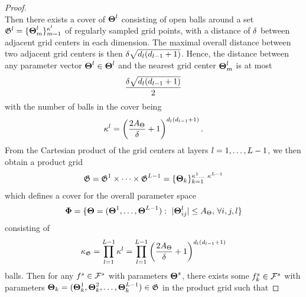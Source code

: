 \documentclass[review,supplement,onefignum,onetabnum]{siamonline250211}
\begin{document}
\begin{proof}
\begin{equation}
\end{equation}
%
Then there exists a cover of $\mathbf{\boldsymbol{\Theta}}^l$ consisting of open balls around a set $\mathfrak{G}^{l} = \{ \boldsymbol{\Theta}^{l}_m \}_{m=1}^{\kappa^l}$ of regularly sampled grid points, with a distance of $\delta $ between adjacent grid centers in each dimension. The maximal overall distance between two adjacent grid centers is then $\delta  \sqrt{{d_l}({d_{l-1}}+1)}$. Hence, the distance between any parameter vector $\boldsymbol{\Theta}^{l} \in \mathbf{\boldsymbol{\Theta}}^l $ and the nearest grid center $\boldsymbol{\Theta}^{l}_m $ is at most
%
\begin{equation*}
\begin{split}
\frac{\delta  \sqrt{{d_l}({d_{l-1}}+1)}}{2}
\end{split}
\end{equation*}
%
with the number of balls in the cover being
\begin{equation*}
\begin{split}
\kappa^l = \left( \frac{2 {A_\Theta}}{\delta}+1  \right)^{ {d_l}({d_{l-1}}+1) }.
\end{split}
\end{equation*}
%
From the Cartesian product of the grid centers at layers $l=1, \dots, L-1$, we then obtain a product grid
%
\begin{equation}
\label{eq_grid_Fs}
\begin{split}
\mathfrak{G}= \mathfrak{G}^1 \times \dots \times \mathfrak{G}^{L-1}  =  \{ \boldsymbol{\Theta}_k  \}_{k=1}^{\kappa^1 \dots \ \kappa^{L-1}}
\end{split}
\end{equation}
%
which defines a cover for the overall parameter space
%
\begin{equation*}
\begin{split}
\mathbf{\Phi}&=\{ \boldsymbol{\Theta}=(\boldsymbol{\Theta} ^{1}, \dots, \boldsymbol{\Theta} ^{L-1}) :  \ |\boldsymbol{\Theta}^{l}_{ij}|  \leq {A_\Theta}, \,\forall i, j, l \} \\
\end{split}
\end{equation*}
%
consisting of 
%
\begin{equation*}
\begin{split}
\kappa_{\mathfrak{G}} = \prod_{l=1}^{L-1}  \kappa^l = \prod_{l=1}^{L-1}  \left( \frac{2 {A_\Theta}}{\delta}+1  \right)^{ {d_l}({d_{l-1}}+1) }
\end{split}
\end{equation*}
%
balls. Then for any $f^s \in \mathcal{F}^s$ with parameters $\boldsymbol{\Theta}^{s}$, there exists some $f^s_k \in \mathcal{F}^s$ with parameters $\boldsymbol{\Theta}_k=(\boldsymbol{\Theta}_{k}^1, \boldsymbol{\Theta}_{k}^2, \dots, \boldsymbol{\Theta}_{k}^{L-1}) \in \mathfrak{G} $ in the product grid such that

\end{proof}
\end{document}
